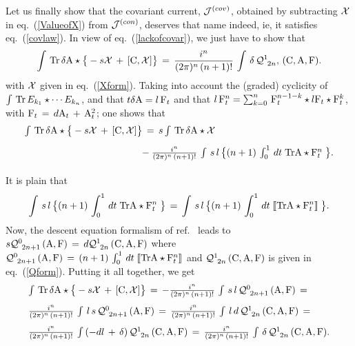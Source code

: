 \documentclass[a4paper,12pt]{article}
\def\cJ{{\cal J}}
\def\cQ{{\cal Q}}
\def\cX{{\cal X}}
\def\A{{\rm A}}
\def\C{{\rm C}}
\def\F{{\rm F}}
\def\bracl{ [\!\!\, [}
\def\bracr{ ]\!\!\, ]}
\begin{document}
Let us finally show that the covariant current, $\cJ^{(cov)}$, obtained 
by subtracting $\cX$ in eq.~(\ref{ValueofX}) from $\cJ^{(con)}$, deserves that 
name indeed, ie, it satisfies eq.~(\ref{covlaw}). In view of 
eq.~(\ref{lackofcovar}), we just have to show that
\begin{displaymath}
\int\,{\rm Tr}\,\delta\A\star\big\{-s\cX\,+\,
[\C,\cX]\big\}\,=\,
\frac{i^n}{(2\pi)^n\,(n+1)!}\,\int\, \delta\,\cQ^{1}_{\;\,2n},
\,(\C,\A,\F).
\end{displaymath}
with $\cX$ given in eq.~(\ref{Xform}). Taking into account the (graded) 
cyclicity of $\int\,{\rm Tr}\, E_{k_1}\star\cdots E_{k_n}$, and 
that $t\delta\A=l\,\F_t$ and that $l\,\F_t^n = \sum_{k=0}^{n}\,
\F_t^{n-1-k}\star l\F_t\star\F_t^k$, with $\F_t\,=\,d\A_t\,+\,\A_t^2$; 
one shows that  
\begin{displaymath}
\begin{array}{l}
{\int\,{\rm Tr}\,\delta\A\star\big\{-s\cX\,+\,
[\C,\cX]\big\}\,=\,s\int\,{\rm Tr}\,\delta\A\star\cX}\\[9pt]
{\phantom{-\int\,{\rm Tr}\,\delta\A\star\big\{s\cX\,-\,
[\C,\cX]\big\}} -\frac{i^n}{(2\pi)^n\,(n+1)!}\,\int\,s\,l\,\big\{(n+1)\,
\int_{0}^{1}\,dt\;{\rm Tr} \A\star\F_t^n\;\big\}.}\\[9pt]
\end{array}
\end{displaymath}
It is plain that 
\begin{displaymath}
\int\,s\,l\,\big\{(n+1)\,
\int_{0}^{1}\,dt\;{\rm Tr} \A\star\F_t^n\;\big\}\,=\,
\int\,s\,l\,\big\{(n+1)\,
\int_{0}^{1}\,dt\;\bracl{\rm Tr} \A\star\F_t^n\bracr\;\big\}.
\end{displaymath}
Now, the descent equation formalism of ref.~\cite{Bonora:2000he} leads to  
$s\cQ^{0}_{\;\,2n+1}\,(\A,\F)\,=\,d\cQ^{1}_{\;\,2n}\,(\C,\A,\F)$
where $\cQ^{0}_{\;\,2n+1}\,(\A,\F)\,=\,(n+1)\,
\int_{0}^{1}\,dt\;\bracl{\rm Tr} \A\star\F_t^n\bracr$ and $\cQ^{1}_{\;\,2n}\,(\C,\A,\F)$ is given in eq.~(\ref{Qform}). Putting it all together, we get 
\begin{displaymath}
\begin{array}{l}
{\int\,{\rm Tr}\,\delta\A\star\big\{-s\cX\,+\,
[\C,\cX]\big\}\,=\,
-\frac{i^n}{(2\pi)^n\,(n+1)!}\,\int\,s\,l\,\cQ^{0}_{\;\,2n+1}\,(\A,\F)
\,=\,}\\[9pt]
{\frac{i^n}{(2\pi)^n\,(n+1)!}\,\int\,l\,s\,\cQ^{0}_{\;\,2n+1}\,(\A,\F)
\,=\,\frac{i^n}{(2\pi)^n\,(n+1)!}\,\int\,l\,
d\,\cQ^{1}_{\;\,2n}\,(\C,\A,\F)\,=\,}\\[9pt]
{\frac{i^n}{(2\pi)^n\,(n+1)!}\,\int\,(-dl\,+\,\delta)
\,\cQ^{1}_{\;\,2n}\,(\C,\A,\F)
\,=\,
\frac{i^n}{(2\pi)^n\,(n+1)!}\,\int\,\delta
\,\cQ^{1}_{\;\,2n}\,(\C,\A,\F).}\\[9pt]
\end{array}
\end{displaymath}
\end{document}
